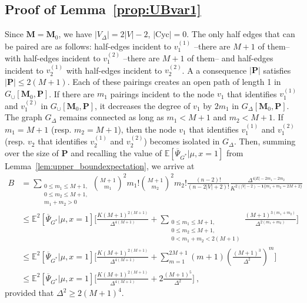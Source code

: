 \documentclass{article}
\begin{document}
\subsection{Proof of Lemma~\ref{prop:UBvar1}}
    Since $\mathbf{M}=\mathbf{M}_0$, we have $|V_{\Delta}|= 2|V|-2$, $|\mathrm{Cyc}|=0$. The only half edges that can be paired are as follows: half-edges incident to $v_{1}^{(1)}$ --there are $M+1$ of them-- with half-edges incident to $v_1^{(2)}$ --there are $M+1$ of them--  and half-edges incident to $v_2^{(1)}$  with half-edges incident to $v_2^{(2)}$. A a consequence $|\mathbf{P}|$ satisfies $|\mathbf{P}|\leq 2(M+1)$. Each of these pairings creates an open path of length 1 in $G_{\cup}[\mathbf{M}_0,\mathbf{P}]$. If there are $m_1$ pairings incident to the node $v_1$ that identifies $v_1^{(1)}$ and $v_1^{(2)}$ in $G_{\cup}[\mathbf{M}_0,\mathbf{P}]$, it decreases the degree of $v_1$ by $2m_1$ in $G_{\Delta}[\mathbf{M}_0,\mathbf{P}]$. 
    The graph $G_{\Delta}$ remains connected as long as $m_1< M+1$ and $m_2< M+1$. If  $m_1=M+1$ (resp. $m_2=M+1$), then the node $v_1$ that identifies $v_1^{(1)}$ and $v_1^{(2)}$ (resp. $v_2$ that identifies $v_2^{(1)}$ and $v_2^{(2)}$) becomes isolated in $G_{\Delta}$. Then, summing over the size of $\mathbf{P}$ and recalling the value of $\mathbb E[\overline{\Psi}_{G^*}|\mu,x=1]$ from Lemma~\ref{lem:upper_boundexpectation}, we arrive at 
\begin{align*}
B&= \sum_{\substack{0\leq m_1\leq M+1,\\ 0\leq m_2\leq M+1 , \\ m_1+m_2>0 }} \binom{M+1}{m_1}^2 m_1! \binom{M+1}{m_2}^2 m_2! \frac{(n-2)!}{(n-2|V|+2)!}\frac{\Delta^{4|E|-2m_1-2m_2}}{K^{2(|V|-2)-\mathbf{1}\{m_1+m_2=2M+2\}}}\\ 
&\leq  \mathbb E^2[\overline{\Psi}_{G^*}|\mu,x=1]\Big[\frac{K(M+1)^{2(M+1)}}{\Delta^{4(M+1)}} + \sum_{\substack{0\leq m_1\leq M+1,\\ 0\leq m_2\leq M+1 , \\ 0 <m_1+m_2<2(M+1)}} \frac{(M+1)^{3(m_1+m_2)} }{\Delta^{2(m_1+m_2)}}\Big]\\ 
&\leq \mathbb E^2[\overline{\Psi}_{G^*}|\mu,x=1]\Big[\frac{K(M+1)^{2(M+1)}}{\Delta^{4(M+1)}} + \sum_{m=1}^{2M+1} (m+1)  \left(\frac{(M+1)^{3}}{\Delta^{2}}\right)^{m  }\Big]\\
&\leq \mathbb E^2[\overline{\Psi}_{G^*}|\mu,x=1]\Big[\frac{K(M+1)^{2(M+1)}}{\Delta^{4(M+1)}} + 2  \frac{(M+1)^{5}}{\Delta^{2}}\Big]\ , 
\end{align*}
provided that $\Delta^2 \geq 2(M+1)^{4}$.
\end{document}
